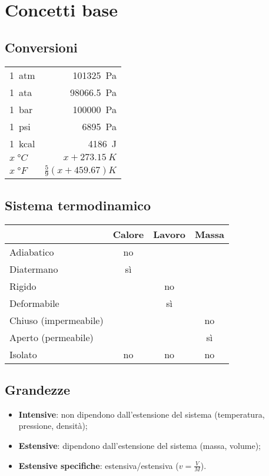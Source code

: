 \section{Concetti base}
\subsection{Conversioni}
\begin{tabular}{lr}
    \toprule
    \SI{1}{atm} & \SI{101325}{Pa} \\
    \SI{1}{ata} & \SI{98066,5}{Pa} \\
    \SI{1}{bar} & \SI{100000}{Pa} \\
    \SI{1}{psi} & \SI{6895}{Pa} \\ \midrule
    \SI{1}{kcal} & \SI{4186}{J} \\ \midrule
    $x\;\si{\degree C}$ & $x + \SI{273,15}{K}$ \\
    $x\;\si{\degree F}$ & $\frac{5}{9}(x + 459.67) \si{K}$ \\
    \bottomrule
\end{tabular}

\subsection{Sistema termodinamico}
\begin{tabular}{lccc}
    \toprule
    & Calore & Lavoro & Massa\\ \midrule
    Adiabatico & no & & \\
    Diatermano & sì & & \\
    Rigido & & no & \\
    Deformabile & & sì & \\
    Chiuso (impermeabile) & & & no \\
    Aperto (permeabile) & & & sì \\
    Isolato & no & no & no \\
    \bottomrule
\end{tabular}

\subsection{Grandezze}
\begin{itemize}
    \item \textbf{Intensive}: non dipendono dall'estensione del sistema (temperatura, pressione, densità);
    \item \textbf{Estensive}: dipendono dall'estensione del sistema (massa, volume);
    \item \textbf{Estensive specifiche}: estensiva/estensiva ($v = \frac{V}{M}$).
\end{itemize}

